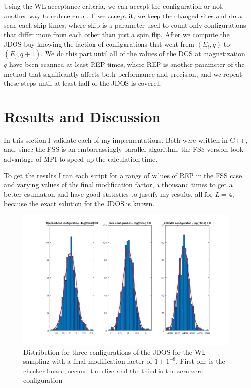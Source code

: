 \documentclass[a4paper, 11pt]{article}
\begin{document}
	Using the WL acceptance criteria, we can accept the configuration or not, another way to reduce error. If we accept it, we keep the changed sites and do a scan each skip times, where skip is a parameter used to count only configurations that differ more from each other than just a spin flip. After we compute the JDOS buy knowing the faction of configurations that went from $(E_i, q)$ to $(E_j, q + 1)$. We do this part until all of the values of the DOS at magnetization $q$ have been scanned at least REP times, where REP is another parameter of the method that significantly affects both performance and precision, and we repeat these steps until at least half of the JDOS is covered.
	\newpage
	
	\section{Results and Discussion}
	
	In this section I validate each of my implementations. Both were written in C++, and, since the FSS is an embarrassingly parallel algorithm, the FSS version took advantage of MPI to speed up the calculation time.
	
	To get the results I ran each script for a range of values of REP in the FSS case, and varying values of the final modification factor, a thousand times to get a better estimation and have good statistics to justify my results, all for $L=4$, because the exact solution for the JDOS is known.
	
	\begin{figure}[h]
		\includegraphics[scale=0.27]{hist_f8_WL}
		\centering
		\caption{Distribution for three configurations of the JDOS for the WL sampling with a final modification factor of $1+1^{-8}$. First one is the checker-board, second the slice and the third is the zero-zero configuration}
	\end{figure}
	
\end{document}
